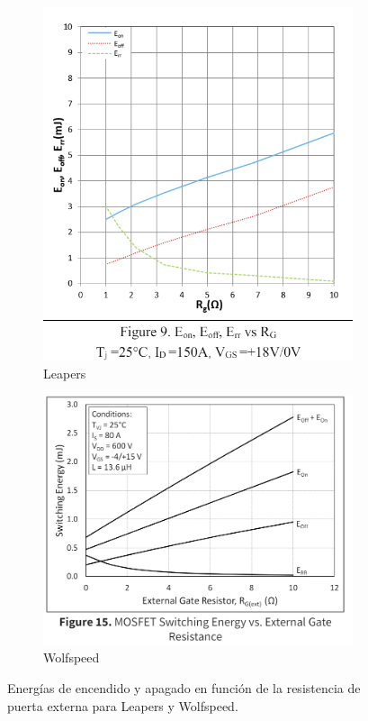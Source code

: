 \begin{figure}[H]
	\centering
	\begin{subfigure}[b]{0.4\linewidth}
		\centering
		\includegraphics[width=\linewidth]{fig/eoneoffleapers_RG}
		\caption{Leapers}
	\end{subfigure}
	\hfill
	\begin{subfigure}[b]{0.55\linewidth}
		\centering
		\includegraphics[width=0.7\linewidth]{fig/eoneoffwolfspeed_RG}
		\caption{Wolfspeed}
	\end{subfigure}
	\caption{Energías de encendido y apagado en función de la resistencia de puerta externa para Leapers y Wolfspeed.}
\end{figure}

